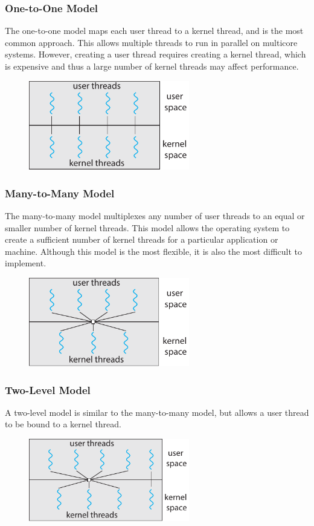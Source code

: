 \documentclass{article}
\begin{document}
\subsubsection{One-to-One Model}
The one-to-one model maps each user thread to a kernel thread, and is
the most common approach. This allows multiple threads to run in
parallel on multicore systems. However, creating a user thread requires
creating a kernel thread, which is expensive and thus a large number of
kernel threads may affect performance.
\begin{figure}[H]
    \centering
    \includegraphics[width = 7cm]{figures/threads_one_to_one.pdf}
\end{figure}
\subsubsection{Many-to-Many Model}
The many-to-many model multiplexes any number of user threads to an
equal or smaller number of kernel threads. This model allows the
operating system to create a sufficient number of kernel threads for a
particular application or machine. Although this model is the most
flexible, it is also the most difficult to implement.
\begin{figure}[H]
    \centering
    \includegraphics[width = 7cm]{figures/threads_many_to_many.pdf}
\end{figure}
\subsubsection{Two-Level Model}
A two-level model is similar to the many-to-many model, but allows a
user thread to be bound to a kernel thread.
\begin{figure}[H]
    \centering
    \includegraphics[width = 7cm]{figures/threads_two_level.pdf}
\end{figure}
\end{document}
